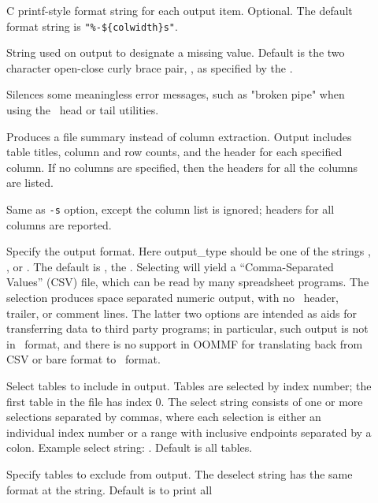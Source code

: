 \begin{description}
\item[]
  C printf-style format string for each output item.  Optional.  The
  default format string is \verb+"%-${colwidth}s"+.
\item[]
  String used on output to designate a missing value.  Default
  is the two character open-close curly brace pair, \ocb\ccb, as
  specified by the .
\item[]
  Silences some meaningless error messages, such as "broken pipe" when
  using the \Unix\ head or tail utilities.
\item[]
  Produces a file summary instead of column extraction.  Output includes
  table titles, column and row counts, and the header for each specified
  column.  If no columns are specified, then the headers for all the
  columns are listed.
\item[]
  Same as  \texttt{-s} option, except the column list is ignored;
  headers for all columns are reported.
\item[]
  Specify the output format.  Here output\_type should be one of the
  strings , , or .  The default is ,
  the .  Selecting  will yield a
  ``Comma-Separated Values'' (CSV) file, which can be read by many
  spreadsheet programs.  The  selection produces space separated
  numeric output, with no \ODT\ header, trailer, or comment lines.  The
  latter two options are intended as aids for transferring data to third
  party programs; in particular, such output is not in \ODT\ format, and
  there is no support in OOMMF for translating back from CSV or bare
  format to \ODT\ format.
\item[]
  Select tables to include in output.  Tables are selected by index
  number; the first table in the file has index 0.  The select string
  consists of one or more selections separated by commas, where each
  selection is either an individual index number or a range with
  inclusive endpoints separated by a colon.  Example select string:
  .  Default is all tables.
\item[]
  Specify tables to exclude from output.  The deselect string has the
  same format at the  string.  Default is to print all

\end{description}
